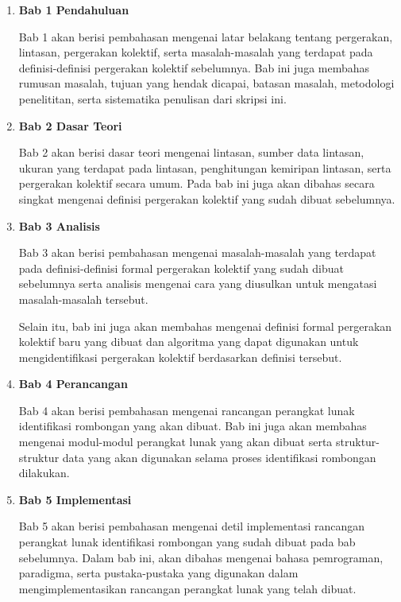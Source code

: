 \begin{enumerate}
    \item \textbf{Bab 1 Pendahuluan}
    
    Bab 1 akan berisi pembahasan mengenai latar belakang tentang pergerakan, lintasan, pergerakan kolektif, serta masalah-masalah yang terdapat pada definisi-definisi pergerakan kolektif sebelumnya. Bab ini juga membahas rumusan masalah, tujuan yang hendak dicapai, batasan masalah, metodologi penelititan, serta sistematika penulisan dari skripsi ini.
    
    \item \textbf{Bab 2 Dasar Teori}
    
    Bab 2 akan berisi dasar teori mengenai lintasan, sumber data lintasan, ukuran yang terdapat pada lintasan, penghitungan kemiripan lintasan, serta pergerakan kolektif secara umum. Pada bab ini juga akan dibahas secara singkat mengenai definisi pergerakan kolektif yang sudah dibuat sebelumnya.
    
    \item \textbf{Bab 3 Analisis}
    
    Bab 3 akan berisi pembahasan mengenai masalah-masalah yang terdapat pada definisi-definisi formal pergerakan kolektif yang sudah dibuat sebelumnya serta analisis mengenai cara yang diusulkan untuk mengatasi masalah-masalah tersebut.
    
    Selain itu, bab ini juga akan membahas mengenai definisi formal pergerakan kolektif baru yang dibuat dan algoritma yang dapat digunakan untuk mengidentifikasi pergerakan kolektif berdasarkan definisi tersebut.
    
    \item \textbf{Bab 4 Perancangan}
    
    Bab 4 akan berisi pembahasan mengenai rancangan perangkat lunak identifikasi rombongan yang akan dibuat. Bab ini juga akan membahas mengenai modul-modul perangkat lunak yang akan dibuat serta struktur-struktur data yang akan digunakan selama proses identifikasi rombongan dilakukan.
    
    \clearpage
    
    \item \textbf{Bab 5 Implementasi}
    
    Bab 5 akan berisi pembahasan mengenai detil implementasi rancangan perangkat lunak identifikasi rombongan yang sudah dibuat pada bab sebelumnya. Dalam bab ini, akan dibahas mengenai bahasa pemrograman, paradigma, serta pustaka-pustaka yang digunakan dalam mengimplementasikan rancangan perangkat lunak yang telah dibuat.
    

\end{enumerate}
